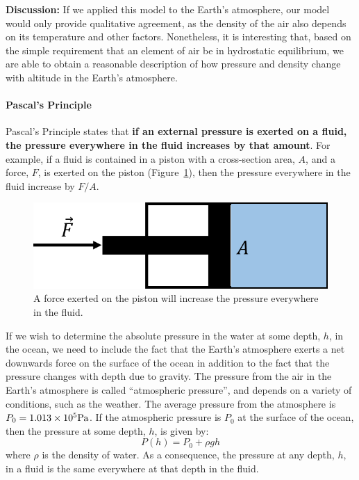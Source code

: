 \begin{framed}
\begin{framed}
\textbf{Discussion:} If we applied this model to the Earth's atmosphere, our model would only provide qualitative agreement, as the density of the air also depends on its temperature and other factors. Nonetheless, it is interesting that, based on the simple requirement that an element of air be in hydrostatic equilibrium, we are able to obtain a reasonable description of how pressure and density change with altitude in the Earth's atmosphere.
\end{framed}
\end{framed}

\paragraph{Pascal's Principle}

Pascal's Principle states that \textbf{if an external pressure is exerted on a fluid, the pressure everywhere in the fluid increases by that amount}. For example, if a fluid is contained in a piston with a cross-section area, $A$, and a force, $F$, is exerted on the piston (Figure~\ref{fig:fluidmechanics:piston}), then the pressure everywhere in the fluid increase by $F/A$.

\begin{figure}[!htbp]
\centering
\includegraphics[width=0.4\linewidth]{files/piston-a5fa6b938507247d21d53e3029e31b09.png}
\caption[]{A force exerted on the piston will increase the pressure everywhere in the fluid.}
\label{fig:fluidmechanics:piston}
\end{figure}

If we wish to determine the absolute pressure in the water at some depth, $h$, in the ocean, we need to include the fact that the Earth's atmosphere exerts a net downwards force on the surface of the ocean in addition to the fact that the pressure changes with depth due to gravity. The pressure from the air in the Earth's atmosphere is called ``atmospheric pressure'', and depends on a variety of conditions, such as the weather. The average pressure from the atmosphere is $P_0=1.013\times 10^5 {\rm Pa}$. If the atmospheric pressure is $P_0$ at the surface of the ocean, then the pressure at some depth, $h$, is given by:
\begin{equation}
P(h) = P_0 + \rho g h
\end{equation}
where $\rho$ is the density of water. As a consequence, the pressure at any depth, $h$, in a fluid is the same everywhere at that depth in the fluid.

